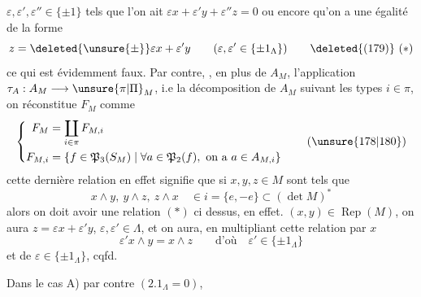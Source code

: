 $\varepsilon,\varepsilon',\varepsilon''\in\{\pm1\}$ tels que l'on ait $\varepsilon x+\varepsilon'y+\varepsilon''z=0$ ou encore qu'on a une égalité de la forme
\[
 z=\deleted{\unsure{\pm}}\varepsilon x+\varepsilon'y\qquad(\varepsilon,\varepsilon'\in\{\pm1_\Lambda\})\tag*{\deleted{(179)} $(*)$}
\]
ce qui est évidemment faux. Par contre,  , en plus de $A_M$, l'application $\tau_A:A_M\longrightarrow\unsure{\pi|\Pi}_M$, i.e la décomposition de $A_M$ suivant les types $i\in\pi$, on réconstitue $F_M$ comme
\[
 \left\{\begin{aligned}
 F_M&=\coprod_{i\in\pi}F_{M,i}\\
 F_{M,i}&=\{f\in\mathfrak P_3(S_M)\mid\forall a\in\mathfrak P_2(f),\text{ on a }a\in A_{M,i}\}
 \end{aligned}\right.\tag*{(\unsure{178|180})}
\]
cette dernière relation en effet signifie que si $x,y,z\in M$ sont tels que
\[
 x\wedge y,\ y\wedge z,\ z\wedge x\quad\in i=\{e,-e\}\subset(\det M)^*
\]
alors on doit avoir une relation $(*)$ ci dessus, en effet.  $(x,y)\in\operatorname{Rep}(M)$, on aura $z=\varepsilon x+\varepsilon'y$,  $\varepsilon,\varepsilon'\in\Lambda$, et on aura, en multipliant cette relation par $x$
\[
 \varepsilon'x\wedge y=x\wedge z\qquad\text{d'où}\quad \varepsilon'\in\{\pm1_\Lambda\}
\]
et de  $\varepsilon\in\{\pm1_\Lambda\}$, cqfd.

Dans le cas A) par contre $(2.1_\Lambda=0)$,
